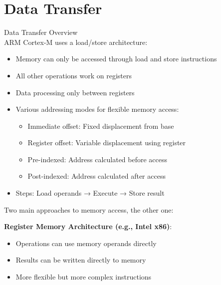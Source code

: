 \section{Data Transfer}

\begin{concept}{Data Transfer Overview}\\
ARM Cortex-M uses a load/store architecture:
\begin{itemize}
  \item Memory can only be accessed through load and store instructions
  \item All other operations work on registers
  \item Data processing only between registers
  \item Various addressing modes for flexible memory access:
    \begin{itemize}
      \item Immediate offset: Fixed displacement from base
      \item Register offset: Variable displacement using register
      \item Pre-indexed: Address calculated before access
      \item Post-indexed: Address calculated after access
    \end{itemize}
    \item Steps: Load operands → Execute → Store result
\end{itemize}
\end{concept}

\begin{remark}
Two main approaches to memory access, the other one:

\textbf{Register Memory Architecture (e.g., Intel x86)}:
    \begin{itemize}
      \item Operations can use memory operands directly
      \item Results can be written directly to memory
      \item More flexible but more complex instructions
    \end{itemize}
\end{remark}

